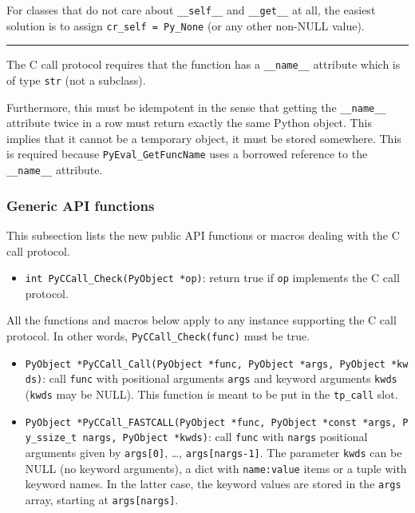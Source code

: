 For classes that do not care about \texttt{\_\_self\_\_} and
\texttt{\_\_get\_\_} at all, the easiest solution is to assign
\texttt{cr\_self\ =\ Py\_None} (or any other non-NULL value).

\begin{center}\rule{0.5\linewidth}{\linethickness}\end{center}

The C call protocol requires that the function has a
\texttt{\_\_name\_\_} attribute which is of type \texttt{str} (not a
subclass).

Furthermore, this must be idempotent in the sense that getting the
\texttt{\_\_name\_\_} attribute twice in a row must return exactly the
same Python object. This implies that it cannot be a temporary object,
it must be stored somewhere. This is required because
\texttt{PyEval\_GetFuncName} uses a borrowed reference to the
\texttt{\_\_name\_\_} attribute.

\subsubsection{Generic API functions}

This subsection lists the new public API functions or macros dealing with
the C call protocol.

\begin{itemize}
\tightlist
\item
  \texttt{int\ PyCCall\_Check(PyObject\ *op)}: return true if
  \texttt{op} implements the C call protocol.
\end{itemize}

All the functions and macros below apply to any instance supporting the
C call protocol. In other words, \texttt{PyCCall\_Check(func)} must be
true.

\begin{itemize}
\tightlist
\item
  \texttt{PyObject\ *PyCCall\_Call(PyObject\ *func,\ PyObject\ *args,\ PyObject\ *kwds)}:
  call \texttt{func} with positional arguments \texttt{args} and keyword
  arguments \texttt{kwds} (\texttt{kwds} may be NULL). This function is
  meant to be put in the \texttt{tp\_call} slot.
\item
  \texttt{PyObject\ *PyCCall\_FASTCALL(PyObject\ *func,\ PyObject\ *const\ *args,\ Py\_ssize\_t\ nargs,\ PyObject\ *kwds)}:
  call \texttt{func} with \texttt{nargs} positional arguments given by
  \texttt{args{[}0{]}}, \ldots{}, \texttt{args{[}nargs-1{]}}. The
  parameter \texttt{kwds} can be NULL (no keyword arguments), a dict
  with \texttt{name:value} items or a tuple with keyword names. In the
  latter case, the keyword values are stored in the \texttt{args} array,
  starting at \texttt{args{[}nargs{]}}.
\end{itemize}

